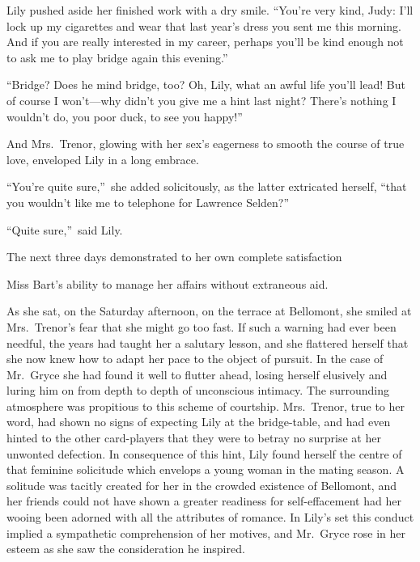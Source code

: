 \documentclass[12pt,a4paper]{book}
\begin{document}
Lily pushed aside her finished work with a dry smile. ``You're very
kind, Judy: I'll lock up my cigarettes and wear that last year's
dress you sent me this morning. And if you are really interested
in my career, perhaps you'll be kind enough not to ask me to play
bridge again this evening.''





``Bridge? Does he mind bridge, too? Oh, Lily, what an awful life
you'll lead! But of course I won't---why didn't you give me a hint
last night? There's nothing I wouldn't do, you poor duck, to see
you happy!''





And Mrs.\ Trenor, glowing with her sex's eagerness to smooth the
course of true love, enveloped Lily in a long embrace.





``You're quite sure,''\ she added solicitously, as the latter
extricated herself, ``that you wouldn't like me to telephone for
Lawrence Selden?''





``Quite sure,''\ said Lily.







The next three days demonstrated to her own complete satisfaction


Miss Bart's ability to manage her affairs without extraneous aid.





As she sat, on the Saturday afternoon, on the terrace at
Bellomont, she smiled at Mrs.\ Trenor's fear that she might go too
fast. If such a warning had ever been needful, the years had
taught her a salutary lesson, and she flattered herself that she
now knew how to adapt her pace to the object of pursuit. In the
case of Mr.\ Gryce she had found it well to flutter ahead, losing
herself elusively and luring him on from depth to depth of
unconscious intimacy. The surrounding atmosphere was propitious
to this scheme of courtship. Mrs.\ Trenor, true to her word, had
shown no signs of expecting Lily at the bridge-table, and had
even hinted to the other card-players that they were to betray no
surprise at her unwonted defection. In consequence of this hint,
Lily found herself the centre of that feminine solicitude which
envelops a young woman in the mating season. A solitude was
tacitly created for her in the crowded existence of Bellomont,
and her friends could not have shown a greater readiness for
self-effacement had her wooing been adorned with all the
attributes of romance. In Lily's set this conduct implied a
sympathetic comprehension of her motives, and Mr.\ Gryce rose in
her esteem as she saw the consideration he inspired.
\end{document}
